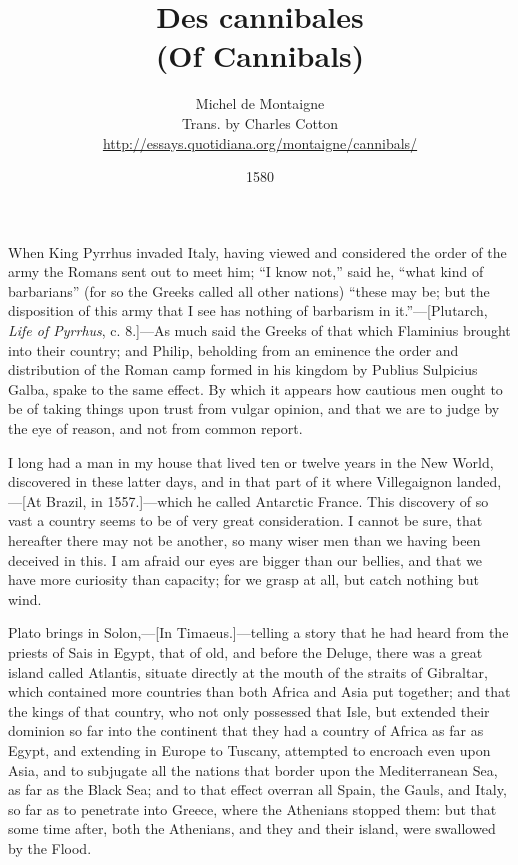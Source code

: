 \documentclass[twocolumn]{article}
\title{Des cannibales \\ (Of Cannibals)}
\author{Michel de Montaigne \\ Trans. by Charles Cotton \\ \url{http://essays.quotidiana.org/montaigne/cannibals/}}
\date{1580}
\newcommand{\accentcolr}{\color{WildStrawberry}}
\newcommand{\spotcolr}[1]{{\accentcolr#1}}
\newcommand{\secheadr}[1]{\rhead{\sffamily\spotcolr{#1}}\thispagestyle{plain}}
\begin{document}
 
\maketitle{}

\thispagestyle{plain}
\secheadr{Des cannibales}

\begingroup
	\beginnumbering
	\autopar
	
\noindent When King Pyrrhus invaded Italy, having viewed and considered the order of the army the Romans sent out to meet him; ``I know not,'' said he, ``what kind of barbarians'' (for so the Greeks called all other nations) ``these may be; but the disposition of this army that I see has nothing of barbarism in it.''---[Plutarch, \emph{Life of Pyrrhus}, c. 8.]---As much said the Greeks of that which Flaminius brought into their country; and Philip, beholding from an eminence the order and distribution of the Roman camp formed in his kingdom by Publius Sulpicius Galba, spake to the same effect. By which it appears how cautious men ought to be of taking things upon trust from vulgar opinion, and that we are to judge by the eye of reason, and not from common report.

	I long had a man in my house that lived ten or twelve years in the New World, discovered in these latter days, and in that part of it where Villegaignon landed,---[At Brazil, in 1557.]---which he called Antarctic France. This discovery of so vast a country seems to be of very great consideration. I cannot be sure, that hereafter there may not be another, so many wiser men than we having been deceived in this. I am afraid our eyes are bigger than our bellies, and that we have more curiosity than capacity; for we grasp at all, but catch nothing but wind.

	Plato brings in Solon,---[In Timaeus.]---telling a story that he had heard from the priests of Sais in Egypt, that of old, and before the Deluge, there was a great island called Atlantis, situate directly at the mouth of the straits of Gibraltar, which contained more countries than both Africa and Asia put together; and that the kings of that country, who not only possessed that Isle, but extended their dominion so far into the continent that they had a country of Africa as far as Egypt, and extending in Europe to Tuscany, attempted to encroach even upon Asia, and to subjugate all the nations that border upon the Mediterranean Sea, as far as the Black Sea; and to that effect overran all Spain, the Gauls, and Italy, so far as to penetrate into Greece, where the Athenians stopped them: but that some time after, both the Athenians, and they and their island, were swallowed by the Flood.
\end{document}
